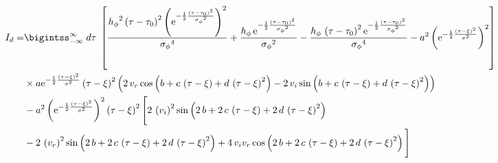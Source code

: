\begin{align}
I_d  =& \bigintss_{-\infty}^{\infty} \; d\tau\; \left[ \frac{{{ h_{\phi}}}^{2} \left( \tau-{ \tau_0} \right) ^{2} \left( {
{\rm e}^{-\frac{1}{2}{\frac { \left( \tau-{ \tau_0} \right) ^{2}}{{{ 
\sigma_{\phi}}}^{2}}}}} \right) ^{2}}{{{ \sigma_{\phi}}}^{4}}+\frac{{ h_{\phi}}
\,{{\rm e}^{-\frac{1}{2}{\frac { \left( \tau-{ \tau_0} \right) ^{2}}{{{ 
\sigma_{\phi}}}^{2}}}}}}{{{ \sigma_{\phi}}}^{2}}-\frac{{ h_{\phi}}\, \left( \tau-{
 \tau_0} \right) ^{2}{{\rm e}^{-\frac{1}{2}{\frac { \left( \tau-{ \tau_0}
 \right) ^{2}}{{{ \sigma_{\phi}}}^{2}}}}}}{{{ \sigma_{\phi}}}^{4}}-{a}^{
2} \left( {{\rm e}^{-\frac{1}{2}{\frac { \left( \tau-\xi \right) ^{2}}{{
\sigma}^{2}}}}} \right) ^{2} \right] \nonumber \\
& \times  a{{\rm e}^{-\frac{1}{2}{\frac { \left( 
\tau-\xi \right) ^{2}}{{\sigma}^{2}}}}} \left( \tau-\xi \right) ^{
2} \left( 2\,v_r \cos \left( b+c\,
 \left( \tau-\xi \right) +d\, \left( \tau-\xi \right) ^{2}
 \right) -2\,v_i \sin \left( b+c\,
 \left( \tau-\xi \right) +d\, \left( \tau-\xi \right) ^{2}
 \right)  \right) \nonumber \\
 &-{a}^{2} \left( {{\rm e}^{-\frac{1}{2}{\frac { \left( \tau-{
 \xi} \right) ^{2}}{{\sigma}^{2}}}}} \right) ^{2} \left( \tau-\xi
 \right) ^{2} \Bigg[ 2\, \left( v_i 
 \right) ^{2}\sin \left( 2\,b+2\,c\, \left( \tau-\xi \right) +2\,d\,
 \left( \tau-\xi \right) ^{2} \right) \nonumber \\
 &-2\, \left( v_r \right) ^{2}\sin \left( 2\,b+2\,c\, \left( \tau-{ \xi
} \right) +2\,d\, \left( \tau-\xi \right) ^{2} \right) +4\,v_i v_r \cos
 \left( 2\,b+2\,c\, \left( \tau-\xi \right) +2\,d\, \left( \tau-{ \xi
} \right) ^{2} \right)  \Bigg] 
\end{align}

